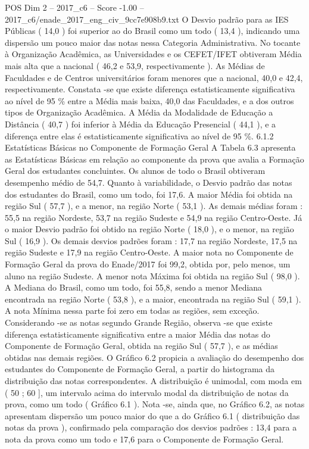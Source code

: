 \begin{textsample}{POS Dim 2 – 2017\_c6 – Score -1.00 – 2017\_c6/enade\_2017\_eng\_civ\_9cc7e908b9.txt}
O Desvio padrão para as IES Públicas ( 14,0 ) foi superior ao do Brasil como um todo ( 13,4 ), indicando uma dispersão um pouco maior das notas nessa Categoria Administrativa.
No tocante à Organização Acadêmica, as Universidades e os CEFET/IFET obtiveram Média mais alta que a nacional ( 46,2 e 53,9, respectivamente ).
As Médias de Faculdades e de Centros universitários foram menores que a nacional, 40,0 e 42,4, respectivamente.
Constata -se que existe diferença estatisticamente significativa ao nível de 95 \% entre a Média mais baixa, 40,0 das Faculdades, e a dos outros tipos de Organização Acadêmica.
A Média da Modalidade de Educação a Distância ( 40,7 ) foi inferior à Média da Educação Presencial ( 44,1 ), e a diferença entre elas é estatisticamente significativa ao nível de 95 \%. 6.1.2 Estatísticas Básicas no Componente de Formação Geral A Tabela 6.3 apresenta as Estatísticas Básicas em relação ao componente da prova que avalia a Formação Geral dos estudantes concluintes.
Os alunos de todo o Brasil obtiveram desempenho médio de 54,7.
Quanto à variabilidade, o Desvio padrão das notas dos estudantes do Brasil, como um todo, foi 17,6.
A maior Média foi obtida na região Sul ( 57,7 ), e a menor, na região Norte ( 53,1 ).
As demais médias foram : 55,5 na região Nordeste, 53,7 na região Sudeste e 54,9 na região Centro-Oeste.
Já o maior Desvio padrão foi obtido na região Norte ( 18,0 ), e o menor, na região Sul ( 16,9 ).
Os demais desvios padrões foram : 17,7 na região Nordeste, 17,5 na região Sudeste e 17,9 na região Centro-Oeste.
A maior nota no Componente de Formação Geral da prova do Enade/2017 foi 99,2, obtida por, pelo menos, um aluno na região Sudeste.
A menor nota Máxima foi obtida na região Sul ( 98,0 ).
A Mediana do Brasil, como um todo, foi 55,8, sendo a menor Mediana encontrada na região Norte ( 53,8 ), e a maior, encontrada na região Sul ( 59,1 ).
A nota Mínima nessa parte foi zero em todas as regiões, sem exceção.
Considerando -se as notas segundo Grande Região, observa -se que existe diferença estatisticamente significativa entre a maior Média das notas do Componente de Formação Geral, obtida na região Sul ( 57,7 ), e as médias obtidas nas demais regiões.
O Gráfico 6.2 propicia a avaliação do desempenho dos estudantes do Componente de Formação Geral, a partir do histograma da distribuição das notas correspondentes.
A distribuição é unimodal, com moda em ( 50 ; 60 ], um intervalo acima do intervalo modal da distribuição de notas da prova, como um todo ( Gráfico 6.1 ).
Nota -se, ainda que, no Gráfico 6.2, as notas apresentam dispersão um pouco maior do que a do Gráfico 6.1 ( distribuição das notas da prova ), confirmado pela comparação dos desvios padrões : 13,4 para a nota da prova como um todo e 17,6 para o Componente de Formação Geral.

\end{textsample}
